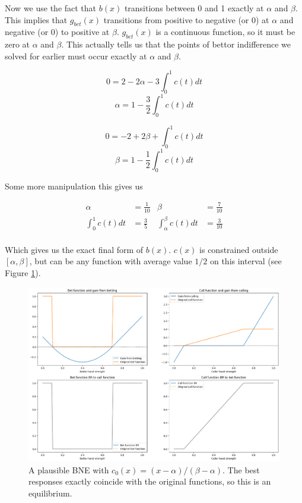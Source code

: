 \documentclass[a4paper,12pt]{article}
\begin{document}
Now we use the fact that $b(x)$ transitions between 0 and 1 exactly at $\alpha$ and $\beta$. This implies that $g_{bet}(x)$ transitions from positive to negative (or 0) at $\alpha$ and negative (or 0) to positive at $\beta$. $g_{bet}(x)$ is a continuous function, so it must be zero at $\alpha$ and $\beta$. This actually tells us that the points of bettor indifference we solved for earlier must occur exactly at $\alpha$ and $\beta$. 

\[ 0  = 2 - 2\alpha - 3 \int_{0}^{1} c(t) dt\]
\[	\alpha =  1- \frac{3}{2} \int_{0}^{1} c(t) dt \]

\[ 0 = -2 + 2\beta + \int_{0}^{1}c(t) dt \]
\[ \beta = 1 - \frac{1}{2}\int_{0}^{1}c(t) dt \]

Some more manipulation this gives us

\begin{align*}
    \alpha & = \frac{1}{10} & \beta & = \frac{7}{10} \\
    \int_{0}^{1} c(t)dt & = \frac{3}{5} & \int_{\alpha}^{\beta} c(t)dt & = \frac{3}{10} \\
\end{align*}

Which gives us the exact final form of $b(x)$. $c(x)$ is constrained outside $[\alpha, \beta]$, but can be any function with average value $1/2$ on this interval (see Figure \ref{BNE}).

\begin{figure}[h]
    \begin{center}
    \includegraphics*[scale=0.4]{../BNE.png}
    \caption{A plausible BNE with $c_0(x) = (x-\alpha)/(\beta-\alpha)$. The best responses exactly coincide with the original functions, so this is an equilibrium.}
    \label{BNE}
    \end{center}
\end{figure}
\end{document}
